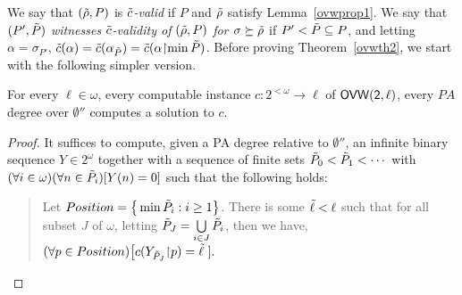 We say that $(\tilde{\rho}, P)$ is \emph{$\tilde{c}$-valid}
if $P$ and $\tilde{\rho}$ satisfy Lemma~\ref{ovwprop1}.
We say that $(P',\tilde{P})$ \emph{witnesses $\tilde{c}$-validity of $(\tilde{\rho}, P)$ for $\sigma \succeq \tilde{\rho}$} if $P' < \tilde{P}  \subseteq P$, and letting $\alpha = \sigma_{P'}$,
$\tilde{c}(\alpha) = \tilde{c}(\alpha_{\tilde{P}}) = \tilde{c}(\alpha
 {\upharpoonright} {\min \tilde{P} })$.
Before proving Theorem~\ref{ovwth2}, we start with
the following simpler version.

\begin{theorem}\label{ovwth1}
For every $\ell\in\omega$, every computable instance  $c:2^{<\omega}\rightarrow
\ell$ of $\sf{OVW}(2,\ell)$,
every $PA$ degree over $\emptyset''$ computes
a solution to $c$.
\end{theorem}
\begin{proof}
It suffices to compute, given a PA degree relative to $\emptyset''$,
an infinite binary sequence $Y\in 2^\omega$
together with a sequence of finite
sets $\tilde{P}_0<\tilde{P}_{1}<\cdots$ with
$(\forall i\in\omega)(\forall n\in \tilde{P}_i)
[Y(n) = 0]$ such that the following holds:
\begin{quote}
Let $Position = \big\{\min \tilde{P}_i : i \geq 1 \big\}$.
There is some $\tilde{\ell}<\ell$ such that for all subset $J$ of $\omega$, letting
 $\tilde{P}_J = \bigcup\limits_{i\in J}\tilde{P}_i$, then we have,
 $
(\forall p\in Position)\big[
c(Y_{\tilde{P}_J}{\upharpoonright} p) = \tilde{\ell}\ ].
$ 	
\end{quote}



\end{proof}
